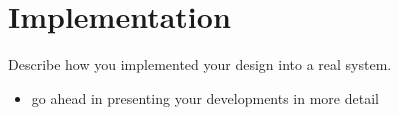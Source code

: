 \chapter{Implementation}

Describe how you implemented your design into a real system.

\begin{itemize}
    \item go ahead in presenting your developments in more detail 
\end{itemize}

